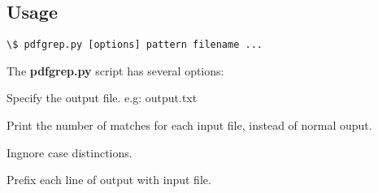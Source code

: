 \documentclass[letterpaper,10pt,oneside]{sphinxmanual}
\begin{document}
\subsection{Usage}
\label{utility:id1}
\begin{Verbatim}[commandchars=\\\{\}]
\$ pdfgrep.py [options] pattern filename ...
\end{Verbatim}

The \textbf{pdfgrep.py} script has several options:

\begin{fulllineitems}
\label{utility:cmdoption-pdfgrep.py-o}
Specify the output file. e.g: output.txt

\end{fulllineitems}


\begin{fulllineitems}
\label{utility:cmdoption-pdfgrep.py-c}
Print the number of matches for each input file, instead of normal ouput.

\end{fulllineitems}


\begin{fulllineitems}
\label{utility:cmdoption-pdfgrep.py-i}
Ingnore case distinctions.

\end{fulllineitems}


\begin{fulllineitems}
\label{utility:cmdoption-pdfgrep.py-f}
Prefix each line of output with input file.

\end{fulllineitems}
\end{document}
